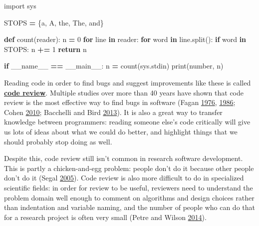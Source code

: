 \documentclass[
]{krantz}
\makeatletter
\newenvironment{Shaded}{\begin{snugshade}}{\end{snugshade}}
\newcommand{\BuiltInTok}[1]{#1}
\newcommand{\ControlFlowTok}[1]{\textcolor[rgb]{0.13,0.29,0.53}{\textbf{#1}}}
\newcommand{\DecValTok}[1]{\textcolor[rgb]{0.00,0.00,0.81}{#1}}
\newcommand{\ImportTok}[1]{#1}
\newcommand{\KeywordTok}[1]{\textcolor[rgb]{0.13,0.29,0.53}{\textbf{#1}}}
\newcommand{\NormalTok}[1]{#1}
\newcommand{\OperatorTok}[1]{\textcolor[rgb]{0.81,0.36,0.00}{\textbf{#1}}}
\newcommand{\StringTok}[1]{\textcolor[rgb]{0.31,0.60,0.02}{#1}}
\newcommand{\VariableTok}[1]{\textcolor[rgb]{0.00,0.00,0.00}{#1}}
\newenvironment{kframe}{%
\medskip{}
\setlength{\fboxsep}{.8em}
 \def\at@end@of@kframe{}%
 \ifinner\ifhmode%
  \def\at@end@of@kframe{\end{minipage}}%
  \begin{minipage}{\columnwidth}%
 \fi\fi%
 \def\FrameCommand##1{\hskip\@totalleftmargin \hskip-\fboxsep
 \colorbox{shadecolor}{##1}\hskip-\fboxsep
     \hskip-\linewidth \hskip-\@totalleftmargin \hskip\columnwidth}%
 \MakeFramed {\advance\hsize-\width
   \@totalleftmargin\z@ \linewidth\hsize
   \@setminipage}}%
 {\par\unskip\endMakeFramed%
 \at@end@of@kframe}
\renewenvironment{Shaded}{\begin{kframe}}{\end{kframe}}
\newcommand{\gref}[2]{\hyperlink{#2}{\textbf{#1}}}
\makeatother
\begin{document}
\begin{Shaded}
\begin{Highlighting}[]
\ImportTok{import}\NormalTok{ sys}


\NormalTok{STOPS }\OperatorTok{=}\NormalTok{ \{}\StringTok{\textquotesingle{}a\textquotesingle{}}\NormalTok{, }\StringTok{\textquotesingle{}A\textquotesingle{}}\NormalTok{, }\StringTok{\textquotesingle{}the\textquotesingle{}}\NormalTok{, }\StringTok{\textquotesingle{}The\textquotesingle{}}\NormalTok{, }\StringTok{\textquotesingle{}and\textquotesingle{}}\NormalTok{\}}


\KeywordTok{def}\NormalTok{ count(reader):}
\NormalTok{    n }\OperatorTok{=} \DecValTok{0}
    \ControlFlowTok{for}\NormalTok{ line }\KeywordTok{in}\NormalTok{ reader:}
        \ControlFlowTok{for}\NormalTok{ word }\KeywordTok{in}\NormalTok{ line.split():}
            \ControlFlowTok{if}\NormalTok{ word }\KeywordTok{in}\NormalTok{ STOPS:}
\NormalTok{                n }\OperatorTok{+=} \DecValTok{1}
    \ControlFlowTok{return}\NormalTok{ n}


\ControlFlowTok{if} \VariableTok{\_\_name\_\_} \OperatorTok{==} \StringTok{\textquotesingle{}\_\_main\_\_\textquotesingle{}}\NormalTok{:}
\NormalTok{    n }\OperatorTok{=}\NormalTok{ count(sys.stdin)}
    \BuiltInTok{print}\NormalTok{(}\StringTok{\textquotesingle{}number\textquotesingle{}}\NormalTok{, n)}
\end{Highlighting}
\end{Shaded}

Reading code in order to find bugs and suggest improvements like these
is called \gref{code review}{code\_review}.
Multiple studies over more than 40 years have shown that
code review is the most effective way to find bugs in software
(Fagan \protect\hyperlink{ref-Faga1976}{1976}, \protect\hyperlink{ref-Faga1986}{1986}; Cohen \protect\hyperlink{ref-Cohe2010}{2010}; Bacchelli and Bird \protect\hyperlink{ref-Bacc2013}{2013}).
It is also a great way to transfer knowledge between programmers:
reading someone else's code critically will give us lots of ideas about what we could do better,
and highlight things that we should probably stop doing as well.

Despite this,
code review still isn't common in research software development.
This is partly a chicken-and-egg problem:
people don't do it because other people don't do it (Segal \protect\hyperlink{ref-Sega2005}{2005}).
Code review is also more difficult to do in specialized scientific fields:
in order for review to be useful,
reviewers need to understand the problem domain well enough to comment on algorithms and design choices
rather than indentation and variable naming,
and the number of people who can do that for a research project is often very small (Petre and Wilson \protect\hyperlink{ref-Petr2014}{2014}).
\end{document}
